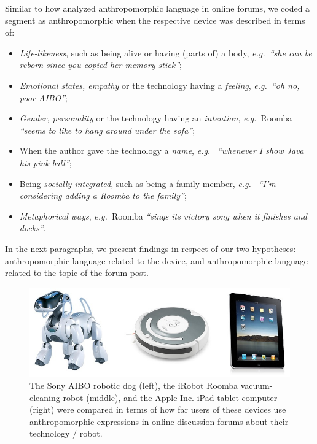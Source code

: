 \documentclass{frontiersSCNS} %
\newcommand{\eg}{{\textit{e.g.~}}}
\begin{document}
Similar to how \cite{friedman_hardware_2003} analyzed anthropomorphic language
in online forums, we coded a segment as anthropomorphic when the respective
device was described in terms of:

\begin{itemize}
    \item \textit{Life-likeness}, such as being alive or having (parts of) a
        body, \eg \textit{``she can be reborn since you copied her memory
        stick''};
    \item \textit{Emotional states, empathy} or the technology having a
        \textit{feeling}, \eg \textit{``oh no, poor AIBO''};
    \item \textit{Gender, personality} or the technology having an
        \textit{intention}, \eg Roomba \textit{``seems to like to hang around
        under the sofa''};
    \item When the author gave the technology a \textit{name}, \eg
        \textit{``whenever I show Java his pink ball''};
    \item Being \textit{socially integrated}, such as being a family member, \eg
        \textit{``I'm considering adding a Roomba to the family''};
    \item \textit{Metaphorical ways}, \eg Roomba \textit{``sings its victory
        song when it finishes and docks''}.
\end{itemize}

In the next paragraphs, we present findings in respect of our two hypotheses:
anthropomorphic language related to the device, and anthropomorphic language
related to the topic of the forum post.

\begin{figure}[b]
    \centering
    \includegraphics[width=0.5\columnwidth]{aibo-roomba-ipad_2.jpg}
    \caption{The Sony AIBO robotic dog (left), the iRobot Roomba vacuum-cleaning robot (middle), and the Apple Inc. iPad tablet computer (right) were compared in terms of how far users of these devices use anthropomorphic expressions in online discussion forums about their technology / robot.}
    \label{fig:aibo-roomba-ipad}
\end{figure}
\end{document}
